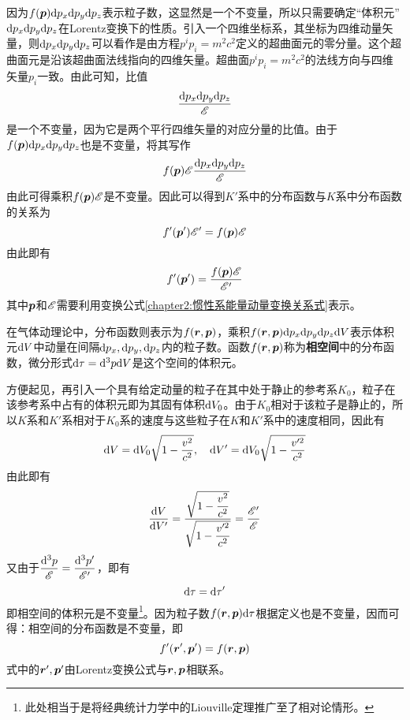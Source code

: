 因为$f(\boldsymbol{p})\mathrm{d} p_x\mathrm{d} p_y \mathrm{d} p_z$表示粒子数，这显然是一个不变量，所以只需要确定“体积元”$\mathrm{d} p_x\mathrm{d} p_y \mathrm{d} p_z$在Lorentz变换下的性质。引入一个四维坐标系，其坐标为四维动量矢量，则$\mathrm{d} p_x\mathrm{d} p_y \mathrm{d} p_z$可以看作是由方程$p^ip_i=m^2c^2$定义的超曲面元的零分量。这个超曲面元是沿该超曲面法线指向的四维矢量。超曲面$p^ip_i=m^2c^2$的法线方向与四维矢量$p_i$一致。由此可知，比值
\begin{equation}
	\frac{\mathrm{d} p_x\mathrm{d} p_y\mathrm{d} p_z}{\mathscr{E}}
\end{equation}
是一个不变量，因为它是两个平行四维矢量的对应分量的比值。由于$f(\boldsymbol{p})\mathrm{d} p_x\mathrm{d} p_y \mathrm{d} p_z$也是不变量，将其写作
\begin{equation*}
	f(\boldsymbol{p})\mathscr{E} \frac{\mathrm{d} p_x\mathrm{d} p_y\mathrm{d} p_z}{\mathscr{E}}
\end{equation*}
由此可得乘积$f(\boldsymbol{p})\mathscr{E}$是不变量。因此可以得到$K'$系中的分布函数与$K$系中分布函数的关系为
\begin{equation*}
	f'(\boldsymbol{p}')\mathscr{E}' = f(\boldsymbol{p})\mathscr{E}
\end{equation*}
由此即有
\begin{equation}
	f'(\boldsymbol{p}') = \frac{f(\boldsymbol{p})\mathscr{E}}{\mathscr{E}'}
\end{equation}
其中$\boldsymbol{p}$和$\mathscr{E}$需要利用变换公式\eqref{chapter2:惯性系能量动量变换关系式}表示。

在气体动理论中，分布函数则表示为$f(\boldsymbol{r},\boldsymbol{p})$，乘积$f(\boldsymbol{r},\boldsymbol{p})\mathrm{d} p_x\mathrm{d} p_y\mathrm{d} p_z\mathrm{d} V$表示体积元$\mathrm{d} V$中动量在间隔$\mathrm{d} p_x, \mathrm{d} p_y, \mathrm{d} p_z$内的粒子数。函数$f(\boldsymbol{r},\boldsymbol{p})$称为{\bf 相空间}中的分布函数，微分形式$\mathrm{d} \tau = \mathrm{d}^3p\mathrm{d} V$是这个空间的体积元。

方便起见，再引入一个具有给定动量的粒子在其中处于静止的参考系$K_0$，粒子在该参考系中占有的体积元即为其固有体积$\mathrm{d} V_0$。由于$K_0$相对于该粒子是静止的，所以$K$系和$K'$系相对于$K_0$系的速度与这些粒子在$K$和$K'$系中的速度相同，因此有
\begin{equation*}
	\mathrm{d} V = \mathrm{d} V_0\sqrt{1-\frac{v^2}{c^2}},\quad \mathrm{d} V' = \mathrm{d} V_0\sqrt{1-\frac{v'^2}{c^2}}
\end{equation*}
由此即有
\begin{equation*}
	\frac{\mathrm{d} V}{\mathrm{d} V'} = \frac{\sqrt{1-\dfrac{v^2}{c^2}}}{\sqrt{1-\dfrac{v'^2}{c^2}}} = \frac{\mathscr{E}'}{\mathscr{E}}
\end{equation*}
又由于$\dfrac{\mathrm{d}^3p}{\mathscr{E}} = \dfrac{\mathrm{d}^3p'}{\mathscr{E}'}$，即有
\begin{equation*}
	\mathrm{d} \tau = \mathrm{d} \tau'
\end{equation*}
即相空间的体积元是不变量\footnote{此处相当于是将经典统计力学中的Liouville定理推广至了相对论情形。}。因为粒子数$f(\boldsymbol{r},\boldsymbol{p})\mathrm{d} \tau$根据定义也是不变量，因而可得：相空间的分布函数是不变量，即
\begin{equation}
	f'(\boldsymbol{r}',\boldsymbol{p}') = f(\boldsymbol{r},\boldsymbol{p})
\end{equation}
式中的$\boldsymbol{r}',\boldsymbol{p}'$由Lorentz变换公式与$\boldsymbol{r},\boldsymbol{p}$相联系。

